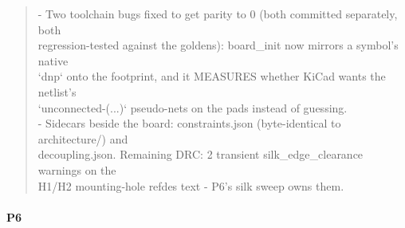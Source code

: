 \documentclass[11pt,a4paper]{article}
\begin{document}
\begin{quote}
- Two toolchain bugs fixed to get parity to 0 (both committed separately, both\\
  regression-tested against the goldens): board\_init now mirrors a symbol's native\\
  `dnp` onto the footprint, and it MEASURES whether KiCad wants the netlist's\\
  `unconnected-(...)` pseudo-nets on the pads instead of guessing.\\
- Sidecars beside the board: constraints.json (byte-identical to architecture/) and\\
  decoupling.json. Remaining DRC: 2 transient silk\_edge\_clearance warnings on the\\
  H1/H2 mounting-hole refdes text - P6's silk sweep owns them.
\end{quote}
\paragraph*{P6}
\end{document}
